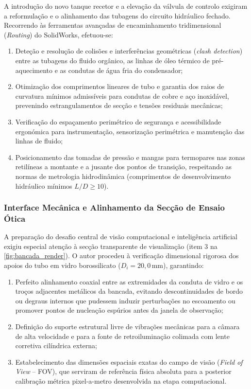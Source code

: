 A introdução do novo tanque recetor e a elevação da válvula de controlo exigiram a reformulação e o alinhamento das tubagens do circuito hidráulico fechado. Recorrendo às ferramentas avançadas de encaminhamento tridimensional (\emph{Routing}) do SolidWorks\textregistered{}, efetuou-se:
\begin{enumerate}
    \item Deteção e resolução de colisões e interferências geométricas (\emph{clash detection}) entre as tubagens do fluido orgânico, as linhas de óleo térmico de pré-aquecimento e as condutas de água fria do condensador;
    \item Otimização dos comprimentos lineares de tubo e garantia dos raios de curvatura mínimos admissíveis para condutas de cobre e aço inoxidável, prevenindo estrangulamentos de secção e tensões residuais mecânicas;
    \item Verificação do espaçamento perimétrico de segurança e acessibilidade ergonómica para instrumentação, sensorização perimétrica e manutenção das linhas de fluido;
    \item Posicionamento das tomadas de pressão e mangas para termopares nas zonas retilíneas a montante e a jusante dos pontos de transição, respeitando as normas de metrologia hidrodinâmica (comprimentos de desenvolvimento hidráulico mínimos $L/D \ge 10$).
\end{enumerate}

\subsubsection{Interface Mecânica e Alinhamento da Secção de Ensaio Ótica}
\label{subsubsec:cad_seccao_otica}

A preparação do desafio central de visão computacional e inteligência artificial exigiu especial atenção à secção transparente de visualização (item 3 na \autoref{fig:bancada_render}). O autor procedeu à verificação dimensional rigorosa dos apoios do tubo em vidro borossilicato ($D_i = 20{,}0\,\mathrm{mm}$), garantindo:
\begin{enumerate}
    \item Perfeito alinhamento coaxial entre as extremidades da conduta de vidro e os troços adjacentes metálicos da bancada, evitando descontinuidades de bordo ou degraus internos que pudessem induzir perturbações no escoamento ou promover pontos de nucleação espúrios antes da janela de observação;
    \item Definição do suporte estrutural livre de vibrações mecânicas para a câmara de alta velocidade e para a fonte de retroiluminação colimada com lente corretiva cilíndrica externa;
    \item Estabelecimento das dimensões espaciais exatas do campo de visão (\emph{Field of View} -- FOV), que serviram de referência física absoluta para a posterior calibração métrica pixel-a-metro desenvolvida na etapa computacional.
\end{enumerate}

